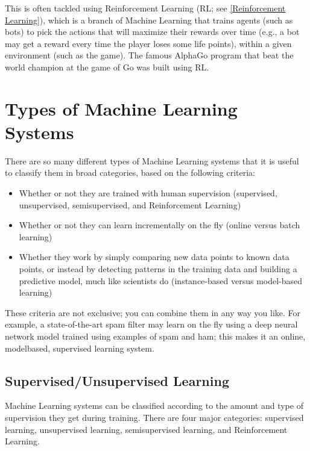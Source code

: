 \begin{itemize}
This is often tackled using Reinforcement Learning (RL; see \autoref{Reinforcement Learning}), which
is a branch of Machine Learning that trains agents (such as bots) to pick the
actions that will maximize their rewards over time (e.g., a bot may get a reward
every time the player loses some life points), within a given environment (such as
the game). The famous AlphaGo program that beat the world champion at the
game of Go was built using RL.
\end{itemize}

\section{Types of Machine Learning Systems}
There are so many different types of Machine Learning systems that it is useful to
classify them in broad categories, based on the following criteria:
\begin{itemize}
\item Whether or not they are trained with human supervision (supervised, unsupervised, semisupervised, and Reinforcement Learning)
\item Whether or not they can learn incrementally on the fly (online versus batch
learning)
\item Whether they work by simply comparing new data points to known data points,
or instead by detecting patterns in the training data and building a predictive
model, much like scientists do (instance-based versus model-based learning)
\end{itemize}

These criteria are not exclusive; you can combine them in any way you like. For
example, a state-of-the-art spam filter may learn on the fly using a deep neural network model trained using examples of spam and ham; this makes it an online, modelbased, supervised learning system.

\subsection{Supervised/Unsupervised Learning}
Machine Learning systems can be classified according to the amount and type of
supervision they get during training. There are four major categories: supervised
learning, unsupervised learning, semisupervised learning, and Reinforcement
Learning.

